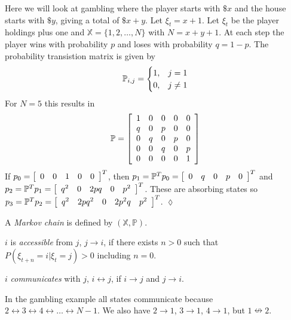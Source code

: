 \begin{example}
Here we will look at gambling where the player starts with $\$x$ and the house starts with $\$y$, giving a total of $\$x+y$. Let $\xi_t=x+1$. Let $\xi_t$ be the player holdings plus one and $\mathbb{X}=\{1,2,\ldots,N\}$ with $N=x+y+1$. At each step the player wins with probability $p$ and loses with probability $q=1-p$. The probability transistion matrix is given by
$$\mathbb{P}_{i,j} = \begin{cases} 1, & j=1 \\ 0, & j\neq1 \end{cases}$$
For $N=5$ this results in
\begin{align*}
\mathbb{P} = \left[\begin{array}{c c c c c}
1 & 0 & 0 & 0 & 0 \\
q & 0 & p & 0 & 0 \\
0 & q & 0 & p & 0 \\
0 & 0 & q & 0 & p \\
0 & 0 & 0 & 0 & 1
\end{array}\right]
\end{align*}
If $p_0 = \left[\begin{array}{c c c c c} 0 & 0 & 1 & 0 & 0 \end{array}\right]^T$, then $p_1=\mathbb{P}^Tp_0 = \left[\begin{array}{c c c c c} 0 & q & 0 & p & 0 \end{array}\right]^T$ and $p_2=\mathbb{P}^Tp_1=\left[\begin{array}{c c c c c} q^2 & 0 & 2pq & 0 & p^2 \end{array}\right]^T$. These are absorbing states so $p_3=\mathbb{P}^Tp_2=\left[\begin{array}{c c c c c} q^2 & 2pq^2 & 0 & 2p^2q & p^2 \end{array}\right]^T$.
$\lozenge$
\end{example}

\begin{definition}
A \textit{Markov chain} is defined by $(\mathbb{X},\mathbb{P})$.
\end{definition}

\begin{definition}
$i$ is \textit{accessible} from $j$, $j\rightarrow i$, if there exists $n>0$ such that $P(\xi_{t+n}=i|\xi_t=j)>0$ including $n=0$.
\end{definition}

\begin{definition}
$i$ \textit{communicates} with $j$, $i\leftrightarrow j$, if $i\rightarrow j$ and $j\rightarrow i$.
\end{definition}
In the gambling example all states communicate because $2\leftrightarrow 3\leftrightarrow 4\leftrightarrow\ldots\leftrightarrow N-1$. We also have $2\rightarrow 1$, $3\rightarrow 1$, $4\rightarrow 1$, but $1\nleftrightarrow 2$.

